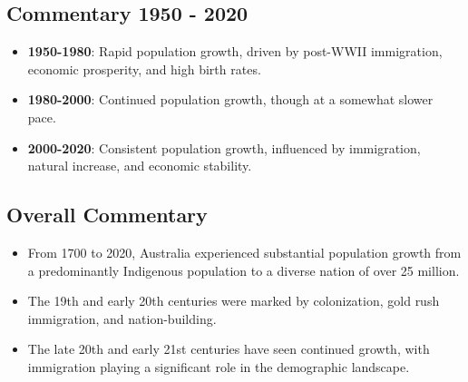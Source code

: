 \subsection*{Commentary 1950 - 2020}
\begin{itemize}
    \item \textbf{1950-1980}: Rapid population growth, driven by post-WWII immigration, economic prosperity, and high birth rates.
    \item \textbf{1980-2000}: Continued population growth, though at a somewhat slower pace.
    \item \textbf{2000-2020}: Consistent population growth, influenced by immigration, natural increase, and economic stability.
\end{itemize}

\subsection*{Overall Commentary}
\begin{itemize}
    \item From 1700 to 2020, Australia experienced substantial population growth from a predominantly Indigenous population to a diverse nation of over 25 million.
    \item The 19th and early 20th centuries were marked by colonization, gold rush immigration, and nation-building.
    \item The late 20th and early 21st centuries have seen continued growth, with immigration playing a significant role in the demographic landscape.
\end{itemize}
